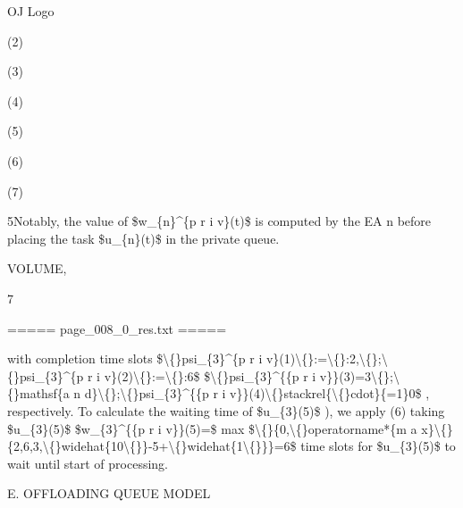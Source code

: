 \documentclass{article}
\begin{document}
OJ Logo

(2)

(3)

(4)

(5)

(6)

(7)

5Notably, the value of \$w\_\{n\}\textasciicircum{}\{p r i v\}(t)\$ is computed by the EA n before placing the task \$u\_\{n\}(t)\$ in the private queue.

VOLUME,

7

===== page\_008\_0\_res.txt =====


with completion time slots \$\textbackslash\{\}psi\_\{3\}\textasciicircum{}\{p r i v\}(1)\textbackslash\{\}:=\textbackslash\{\}:2,\textbackslash\{\};\textbackslash\{\}psi\_\{3\}\textasciicircum{}\{p r i v\}(2)\textbackslash\{\}:=\textbackslash\{\}:6\$ \$\textbackslash\{\}psi\_\{3\}\textasciicircum{}\{\{p r i v\}\}(3)=3\textbackslash\{\};\textbackslash\{\}mathsf\{a n d\}\textbackslash\{\};\textbackslash\{\}psi\_\{3\}\textasciicircum{}\{\{p r i v\}\}(4)\textbackslash\{\}stackrel\{\textbackslash\{\}cdot\}\{=1\}0\$ , respectively. To calculate the waiting time of \$u\_\{3\}(5)\$ ), we apply (6) taking \$u\_\{3\}(5)\$ \$w\_\{3\}\textasciicircum{}\{\{p r i v\}\}(5)=\$ max \$\textbackslash\{\}\{0,\textbackslash\{\}operatorname*\{m a x\}\textbackslash\{\}\{2,6,3,\textbackslash\{\}widehat\{10\textbackslash\{\}\}-5+\textbackslash\{\}widehat\{1\textbackslash\{\}\}\}=6\$ time slots for \$u\_\{3\}(5)\$ to wait until start of processing.

E. OFFLOADING QUEUE MODEL
\end{document}
